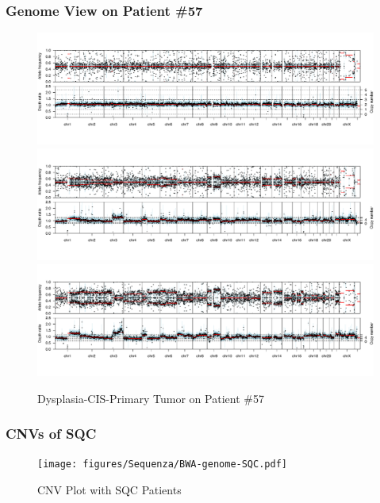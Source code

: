 \documentclass{beamer}
\begin{document}
    \begin{frame}
        \frametitle{Genome View on Patient \#57}

        \begin{figure}
            \includegraphics[width=\linewidth]{figures/Sequenza/57D1.pdf}
            \includegraphics[width=\linewidth]{figures/Sequenza/57C1.pdf}
            \includegraphics[width=\linewidth]{figures/Sequenza/57P1.pdf}
            \caption{Dysplasia-CIS-Primary Tumor on Patient \#57}
        \end{figure}
    \end{frame}

    \begin{frame}
        \frametitle{CNVs of SQC}

        \begin{figure}
            \texttt{[image: figures/Sequenza/BWA-genome-SQC.pdf]}
            \caption{CNV Plot with SQC Patients}
        \end{figure}
    \end{frame}
\end{document}
